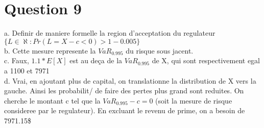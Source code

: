 \section{Question 9}

 a. Definir de maniere formelle la region d'acceptation du regulateur\\
 $\{ L\in \aleph: Pr(L=X-c < 0) > 1 - 0.005 \}$\\
 
 b. Cette mesure represente la $VaR_{0.995}$ du risque sous jacent.\\
 
 c. Faux, $1.1*E[X]$ est au deça de la $VaR_{0.995}$ de X, qui sont respectivement egal a 1100 et 7971\\
 
 d. Vrai, en ajoutant plus de capital, on translationne la distribution de X vers la gauche. Ainsi les probabilit/ de faire des pertes plus grand sont reduites. On cherche le montant c tel que la $VaR_0.995-c =0$ (soit la mesure de risque consideree par le regulateur). En excluant le revenu de prime, on a besoin de 7971.15\$
